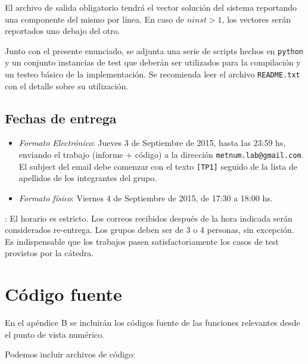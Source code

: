 \begin{appendices}
      El archivo de salida obligatorio tendrá el vector solución del sistema reportando una componente del mismo por línea. En caso de $ninst > 1$, los vectores serán reportados uno debajo del otro.

      Junto con el presente enunciado, se adjunta una serie de scripts hechos en \texttt{python} y un conjunto instancias de test que deberán ser utilizados para la compilación y un testeo básico de la implementación. Se recomienda leer el archivo \texttt{README.txt} con el detalle sobre su utilización.

    \subsection{Fechas de entrega}
      \begin{itemize}
        \item \emph{Formato Electrónico}: Jueves 3 de Septiembre de 2015, hasta las 23:59 hs, enviando el trabajo (informe + código) a la dirección \texttt{metnum.lab@gmail.com}. El subject del email debe comenzar con el texto \texttt{[TP1]} seguido de la lista de apellidos de los integrantes del grupo.
        \item \emph{Formato físico}: Viernes 4 de Septiembre de 2015, de 17:30 a 18:00 hs.
      \end{itemize}

      : El horario es estricto. Los correos recibidos después de la hora indicada serán considerados re-entrega. Los grupos deben ser de 3 o 4 personas, sin excepción. Es indispensable que los trabajos pasen satisfactoriamente los casos de test provistos por la cátedra.

  \newpage
  \section{Código fuente}

    {\color{Gray} En el apéndice B se incluirán los códigos fuente de las funciones relevantes desde el punto de vista numérico.

    Podemos incluir archivos de código:
    }

\end{appendices}
